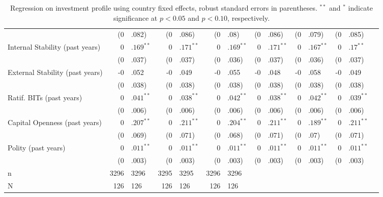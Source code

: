 \begin{table}[ht]
\begin{tabular}{lr@{} lr@{}lr@{}lr@{} lr@{}lr@{}lr@{}}
   & (0&.082) & (0&.086) & (0&.08) & (0&.086) & (0&.079) & (0&.085) \\ 
  Internal Stability (past  years) & $0$&$.169^{\ast\ast}$ & $0$&$.171^{\ast\ast}$ & $0$&$.169^{\ast\ast}$ & $0$&$.171^{\ast\ast}$ & $0$&$.167^{\ast\ast}$ & $0$&$.17^{\ast\ast}$ \\ 
   & (0&.037) & (0&.037) & (0&.036) & (0&.037) & (0&.036) & (0&.037) \\ 
  External Stability (past  years) & -0&.052 & -0&.049 & -0&.055 & -0&.048 & -0&.058 & -0&.049 \\ 
   & (0&.038) & (0&.038) & (0&.038) & (0&.038) & (0&.038) & (0&.038) \\ 
  Ratif. BITs (past  years) & $0$&$.041^{\ast\ast}$ & $0$&$.038^{\ast\ast}$ & $0$&$.042^{\ast\ast}$ & $0$&$.038^{\ast\ast}$ & $0$&$.042^{\ast\ast}$ & $0$&$.039^{\ast\ast}$ \\ 
   & (0&.006) & (0&.006) & (0&.006) & (0&.006) & (0&.006) & (0&.006) \\ 
  Capital Openness (past  years) & $0$&$.207^{\ast\ast}$ & $0$&$.211^{\ast\ast}$ & $0$&$.204^{\ast\ast}$ & $0$&$.211^{\ast\ast}$ & $0$&$.189^{\ast\ast}$ & $0$&$.211^{\ast\ast}$ \\ 
   & (0&.069) & (0&.071) & (0&.068) & (0&.071) & (0&.07) & (0&.071) \\ 
  Polity (past  years) & $0$&$.011^{\ast\ast}$ & $0$&$.011^{\ast\ast}$ & $0$&$.011^{\ast\ast}$ & $0$&$.011^{\ast\ast}$ & $0$&$.011^{\ast\ast}$ & $0$&$.011^{\ast\ast}$ \\ 
   & (0&.003) & (0&.003) & (0&.003) & (0&.003) & (0&.003) & (0&.003) \\ 
   \hline
n & 3296 & 3296 & 3295 & 3295 & 3296 & 3296 \\ 
  N & 126 & 126 & 126 & 126 & 126 & 126 \\ 
   \hline
\hline
\end{tabular}
\endgroup
\caption{Regression on investment profile using country fixed effects, robust standard errors in parentheses. $^{**}$ and $^{*}$ indicate significance at $p< 0.05 $ and $p< 0.10 $, respectively.} 
\end{table}
